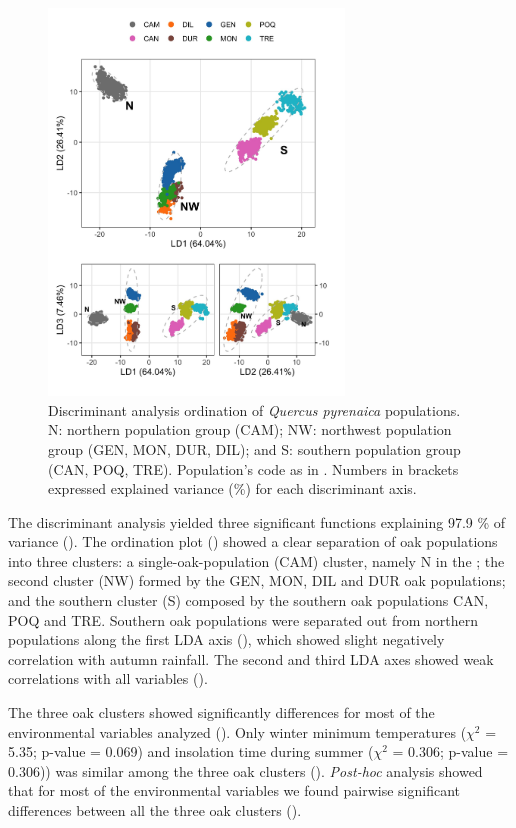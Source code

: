\begin{figure}
\centering
\includegraphics[width=0.7\textwidth]{img/multivariante/lda_biplotsv2} \caption{Discriminant analysis ordination of \textit{Quercus pyrenaica} populations. N: northern population group (CAM); NW: northwest population group (GEN, MON, DUR, DIL); and S: southern population group (CAN, POQ, TRE). Population's code as in  . Numbers in brackets expressed explained variance (\%) for each discriminant axis.} \label{fig:multivar:lda}
\end{figure}

The discriminant analysis yielded three significant functions explaining 97.9 \% of variance (). The ordination plot () showed a clear separation of oak populations into three clusters: a single-oak-population (CAM) cluster, namely N in the ; the second cluster (NW) formed by the GEN, MON, DIL and DUR oak populations; and the southern cluster (S) composed by the southern oak populations CAN, POQ and TRE. Southern oak populations were separated out from northern populations along the first LDA axis (), which showed slight negatively correlation with autumn rainfall. The second and third LDA axes showed weak correlations with all variables ().

The three oak clusters showed significantly differences for most of the environmental variables analyzed (). Only winter minimum temperatures (\(\chi^2\) = 5.35; p-value = 0.069) and insolation time during summer (\(\chi^2\) = 0.306; p-value = 0.306)) was similar among the three oak clusters (). \emph{Post-hoc} analysis showed that for most of the environmental variables we found pairwise significant differences between all the three oak clusters ().

